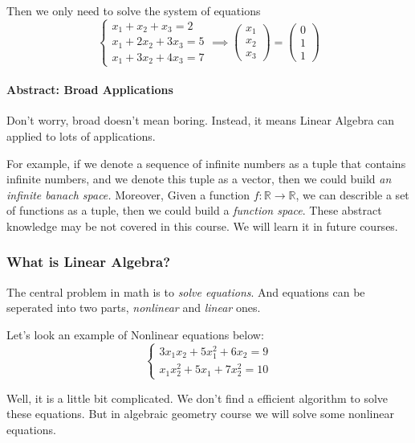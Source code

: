 \begin{example}
Then we only need to solve the system of equations 
\[\left\{ \begin{gathered}
x_1 + x_2 + x_3 = 2 \\
x_1 + 2x_2 + 3x_3 = 5 \\
x_1 + 3x_2 + 4x_3 = 7
\end{gathered} \right.
\implies \begin{pmatrix}
x_1 \\ x_2 \\ x_3
\end{pmatrix} = \begin{pmatrix}
0 \\ 1 \\ 1
\end{pmatrix}
\]
\end{example}
\paragraph{Abstract: Broad Applications}

Don't worry, broad doesn't mean boring. Instead, it means Linear Algebra can applied to lots of applications.

For example, if we denote a sequence of infinite numbers as a tuple that contains infinite numbers, and we denote this tuple as a vector, then we could build \emph{an infinite banach space.} Moreover, Given a function $f:\mathbb{R} \to \mathbb{R}$, we can describle a set of functions as a tuple, then we could build a \emph{function space}. These abstract knowledge may be not covered in this course. We will learn it in future courses.

\subsubsection{What is Linear Algebra?}
The central problem in math is to \emph{solve equations}. And equations can be seperated into two parts, \emph{nonlinear} and \emph{linear} ones. 

Let's look an example of Nonlinear equations below:
\[ 
\left\{ \begin{gathered}
3x_1x_2 + 5x_1^2 + 6x_2 = 9 \\
x_1x_2^2 + 5x_1 + 7x_2^2 = 10
\end{gathered}
\right.
\]

Well, it is a little bit complicated. We don't find a efficient algorithm to solve these equations. But in algebraic geometry course we will solve some nonlinear equations.

